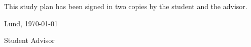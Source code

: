 \documentclass[en,cm,10pt]{inst}
\begin{document}
	\noindent This study plan has been signed in two copies by the student and the advisor.
	
	\vspace{0.5cm}
	\noindent
	Lund, \today
	
	\vspace{1.0cm}
	\noindent Student \hspace{5cm}Advisor
	
	
\end{document}
